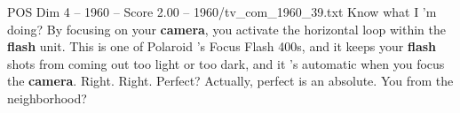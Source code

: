 \begin{textsample}{POS Dim 4 – 1960 – Score 2.00 – 1960/tv\_com\_1960\_39.txt}  \label{ex:f4_pos_006}
Know what I 'm doing?
By focusing on your \textbf{camera}, you activate the horizontal loop within the \textbf{flash} unit.
This is one of Polaroid 's Focus Flash 400s, and it keeps your \textbf{flash} shots from coming out too light or too dark, and it 's automatic when you focus the \textbf{camera}.
Right.
Right.
Perfect?
Actually, perfect is an absolute.
You from the neighborhood?

\end{textsample}
